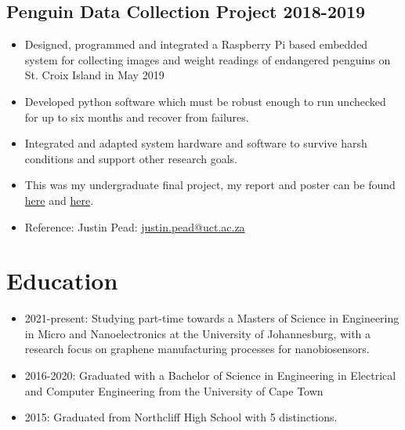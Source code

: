 \documentclass[10pt,a4paper,notitlepage]{article}
\begin{document}
\subsection*{Penguin Data Collection Project 2018-2019}
\begin{itemize}[noitemsep]
	\setlength\itemsep{0.02em}
    \item Designed, programmed and integrated a Raspberry Pi based embedded system for collecting images and weight readings of endangered penguins on St. Croix Island in May 2019
    \item Developed python software which must be robust enough to run unchecked for up to six months and recover from failures.
    \item Integrated and adapted system hardware and software to survive harsh conditions and support other research goals.
    \item This was my undergraduate final project, my report and poster can be found \href{https://awful.cloud/upl/thesis.pdf}{here} and \href{https://awful.cloud/upl/poster.pdf}{here}.
    \item Reference: Justin Pead: \href{mailto:justin.pead@uct.ac.za}{justin.pead@uct.ac.za}
\end{itemize}

\section*{Education}
\begin{itemize}[noitemsep]
	\setlength\itemsep{0.02em}
    \item 2021-present: Studying part-time towards a Masters of Science in Engineering in Micro and Nanoelectronics at the University of Johannesburg, with a research focus on graphene manufacturing processes for nanobiosensors.
    \item 2016-2020: Graduated with a Bachelor of Science in Engineering in Electrical and Computer Engineering from the University of Cape Town
    \item 2015: Graduated from Northcliff High School with 5 distinctions.
\end{itemize}
\end{document}
